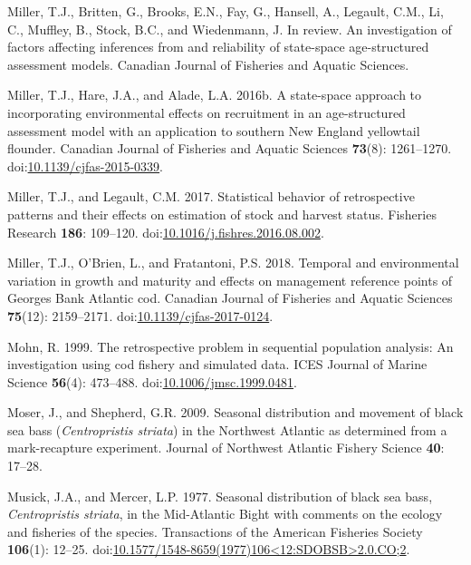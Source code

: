 \documentclass[
]{article}
\newlength{\cslhangindent}
\newlength{\cslentryspacingunit} %
\newenvironment{CSLReferences}[2] %
 {%
  \setlength{\parindent}{0pt}
  \ifodd #1
  \let\oldpar\par
  \def\par{\hangindent=\cslhangindent\oldpar}
  \fi
  \setlength{\parskip}{#2\cslentryspacingunit}
 }%
 {}
\begin{document}
\begin{CSLReferences}{1}{0}
\leavevmode{}%
Miller, T.J., Britten, G., Brooks, E.N., Fay, G., Hansell, A., Legault, C.M., Li, C., Muffley, B., Stock, B.C., and Wiedenmann, J. In review. An investigation of factors affecting inferences from and reliability of state-space age-structured assessment models. Canadian Journal of Fisheries and Aquatic Sciences.

\leavevmode{}%
Miller, T.J., Hare, J.A., and Alade, L.A. 2016b. A state-space approach to incorporating environmental effects on recruitment in an age-structured assessment model with an application to southern {New England} yellowtail flounder. Canadian Journal of Fisheries and Aquatic Sciences \textbf{73}(8): 1261--1270. doi:\href{https://doi.org/10.1139/cjfas-2015-0339}{10.1139/cjfas-2015-0339}.

\leavevmode{}%
Miller, T.J., and Legault, C.M. 2017. Statistical behavior of retrospective patterns and their effects on estimation of stock and harvest status. Fisheries Research \textbf{186}: 109--120. doi:\href{https://doi.org/10.1016/j.fishres.2016.08.002}{10.1016/j.fishres.2016.08.002}.

\leavevmode{}%
Miller, T.J., O'Brien, L., and Fratantoni, P.S. 2018. Temporal and environmental variation in growth and maturity and effects on management reference points of {Georges Bank Atlantic} cod. Canadian Journal of Fisheries and Aquatic Sciences \textbf{75}(12): 2159--2171. doi:\href{https://doi.org/10.1139/cjfas-2017-0124}{10.1139/cjfas-2017-0124}.

\leavevmode{}%
Mohn, R. 1999. The retrospective problem in sequential population analysis: An investigation using cod fishery and simulated data. ICES Journal of Marine Science \textbf{56}(4): 473--488. doi:\href{https://doi.org/10.1006/jmsc.1999.0481}{10.1006/jmsc.1999.0481}.

\leavevmode{}%
Moser, J., and Shepherd, G.R. 2009. Seasonal distribution and movement of black sea bass (\emph{{C}entropristis striata}) in the {N}orthwest {A}tlantic as determined from a mark-recapture experiment. Journal of Northwest Atlantic Fishery Science \textbf{40}: 17--28.

\leavevmode{}%
Musick, J.A., and Mercer, L.P. 1977. Seasonal distribution of black sea bass, \emph{{C}entropristis striata}, in the {M}id-{A}tlantic {B}ight with comments on the ecology and fisheries of the species. Transactions of the American Fisheries Society \textbf{106}(1): 12--25. doi:\href{https://doi.org/10.1577/1548-8659(1977)106\%3C12:SDOBSB\%3E2.0.CO;2}{10.1577/1548-8659(1977)106\textless12:SDOBSB\textgreater2.0.CO;2}.


\end{CSLReferences}
\end{document}
